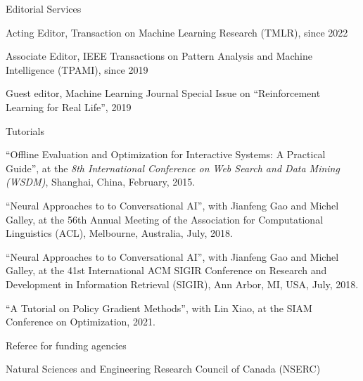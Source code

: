 \documentclass[10pt,twoside,letterpaper]{article}
\newcommand{\venuefont}[1]{{\textit{#1}}}
\newcommand{\negitemspace}{\vspace{1mm}}
\begin{document}
\begin{compactitem}
\item{Editorial Services} \negitemspace

\begin{compactitem}

\item{Acting Editor, Transaction on Machine Learning Research (TMLR), since 2022}

\item{Associate Editor, IEEE Transactions on Pattern Analysis and Machine Intelligence (TPAMI), since 2019}

\item{Guest editor, Machine Learning Journal Special Issue on ``Reinforcement Learning for Real Life'', 2019}

\end{compactitem}

\item{Tutorials} \negitemspace

\begin{compactitem}

\item{``Offline Evaluation and Optimization for Interactive Systems: A Practical Guide'', at the \venuefont{8th International Conference on Web Search and Data Mining (WSDM)}, Shanghai, China, February, 2015.}

\item{``Neural Approaches to to Conversational AI'', with Jianfeng Gao and Michel Galley, at the 56th Annual Meeting of the Association for Computational Linguistics (ACL), Melbourne, Australia, July, 2018.}

\item{``Neural Approaches to to Conversational AI'', with Jianfeng Gao and Michel Galley, at the 41st International ACM SIGIR Conference on Research and Development in Information Retrieval (SIGIR), Ann Arbor, MI, USA, July, 2018.}

\item{``A Tutorial on Policy Gradient Methods'', with Lin Xiao, at the SIAM Conference on Optimization, 2021.}

\end{compactitem} \negitemspace

\item{Referee for funding agencies} \negitemspace

\begin{compactitem}

\item{Natural Sciences and Engineering Research Council of Canada (NSERC)}


\end{compactitem}
\end{compactitem}
\end{document}
